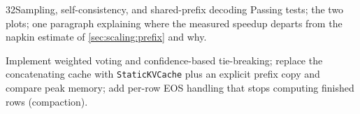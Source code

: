 \begin{labbox}{32}{Sampling, self-consistency, and shared-prefix decoding}
Passing tests; the two plots; one paragraph explaining where the measured speedup departs from the
napkin estimate of \cref{sec:scaling:prefix} and why.

Implement weighted voting and confidence-based tie-breaking; replace the concatenating cache with
\texttt{StaticKVCache} plus an explicit prefix copy and compare peak memory; add per-row EOS handling
that stops computing finished rows (compaction).
\end{labbox}
